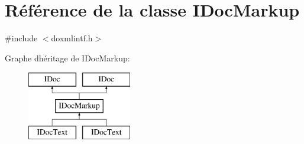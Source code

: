 \hypertarget{class_i_doc_markup}{}\section{Référence de la classe I\+Doc\+Markup}
\label{class_i_doc_markup}


{\ttfamily \#include $<$doxmlintf.\+h$>$}

Graphe d\textquotesingle{}héritage de I\+Doc\+Markup\+:\begin{figure}[H]
\begin{center}
\leavevmode
\includegraphics[height=3.000000cm]{class_i_doc_markup}
\end{center}
\end{figure}
